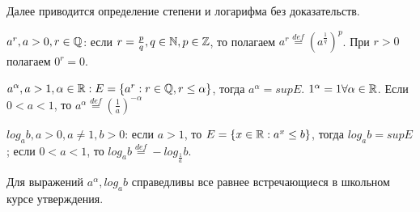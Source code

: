 \documentclass[main]{subfiles}
\begin{document}
Далее приводится определение степени и логарифма без доказательств.

\begin{definition}
    $a^r, a > 0, r \in \mathbb{Q}$: если $r = \frac{p}{q}, q \in \mathbb{N}, p \in \mathbb{Z}$, то 
    полагаем $a^r \overset{def}{=} \left(a^{\frac{1}{q}}\right)^p$. При $r > 0$
    полагаем $0^r = 0$.
\end{definition}

\begin{definition}
    $a^\alpha, a > 1, \alpha \in \mathbb{R} : E = \left\{a^r : r \in \mathbb{Q}, r \leq \alpha
    \right\}$, тогда $a^\alpha = supE$. $1^\alpha = 1 \forall \alpha \in \mathbb{R}$.
    Если $0 < a < 1$, то $a^\alpha \overset{def}{=} 
    \left(\frac{1}{a}\right)^{-\alpha}$
\end{definition}

\begin{definition}
    $log_ab, a > 0, a \neq 1, b > 0$: если $a > 1$, то $E = \left\{
        x \in \mathbb{R}: a^x \leq b \right\}$, тогда $log_ab = supE$; если 
        $0 < a < 1$, то $log_ab \overset{def}{=} -log_{\frac{1}{a}}b$. 
\end{definition}

\begin{theorem}
    Для выражений $a^\alpha, log_ab$ справедливы все равнее встречающиеся в 
    школьном курсе утверждения.
\end{theorem}
\end{document}
